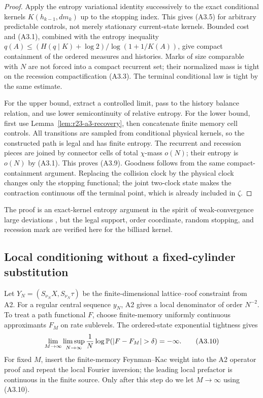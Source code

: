 \begin{proof}
Apply the entropy variational identity successively to the exact conditional
kernels $K(h_{k-1},dm_k)$ up to the stopping index.  This gives (A3.5) for
arbitrary predictable controls, not merely stationary current-state kernels.
Bounded cost and (A3.1), combined with the entropy inequality
$q(A)\le(H(q\mid K)+\log2)/\log(1+1/K(A))$, give compact containment of the
ordered measures and histories.  Marks of size comparable with $N$ are not
forced into a compact recurrent set; their normalized mass is tight on the
recession compactification (A3.3).  The terminal conditional law is tight by
the same estimate.

For the upper bound, extract a controlled limit, pass to the history balance
relation, and use lower semicontinuity of relative entropy.  For the lower
bound, first use Lemma~\ref{lem:r23-a3-recovery}, then concatenate finite
memory cell controls.  All transitions are sampled from conditional physical
kernels, so the constructed path is legal and has finite entropy.  The
recurrent and recession pieces are joined by connector cells of total
$\chi$-mass $o(N)$; their entropy is $o(N)$ by (A3.1).  This proves (A3.9).
Goodness follows from the same compact-containment argument.  Replacing the
collision clock by the physical clock changes only the stopping functional;
the joint two-clock state makes the contraction continuous off the terminal
point, which is already included in $\zeta$.
\end{proof}

The proof is an exact-kernel entropy argument in the spirit of weak-convergence
large deviations \cite{DupuisEllis1997,FengKurtz2006}, but the legal support,
order coordinate, random stopping, and recession mark are verified here for
the billiard kernel.

\subsection{Local conditioning without a fixed-cylinder substitution}

Let $Y_N=(S_{\nu_N}X,S_{\nu_N}\tau)$ be the finite-dimensional lattice--roof
constraint from A2.  For a regular central sequence $y_N$, A2 gives a local
denominator of order $N^{-2}$.  To treat a path functional $F$, choose
finite-memory uniformly continuous approximants $F_M$ on rate sublevels.
The ordered-state exponential tightness gives
\[
 \lim_{M\to\infty}\limsup_{N\to\infty}{1\over N}
 \log\mathbb P(|F-F_M|>\delta)=-\infty.                  \tag{A3.10}
\]
For fixed $M$, insert the finite-memory Feynman--Kac weight into the A2
operator proof and repeat the local Fourier inversion; the leading local
prefactor is continuous in the finite source.  Only after this step do we let
$M\to\infty$ using (A3.10).

